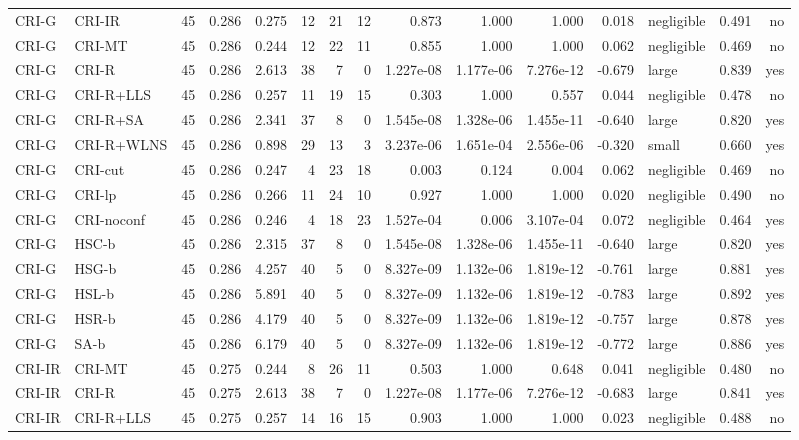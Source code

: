 \begin{table}[htbp]
\begin{tabular}{llrrrrrrrrrrlrr}
CRI-G & CRI-IR & 45 & 0.286 & 0.275 & 12 & 21 & 12 & 0.873 & 1.000 & 1.000 & 0.018 & negligible & 0.491 & no \\
CRI-G & CRI-MT & 45 & 0.286 & 0.244 & 12 & 22 & 11 & 0.855 & 1.000 & 1.000 & 0.062 & negligible & 0.469 & no \\
CRI-G & CRI-R & 45 & 0.286 & 2.613 & 38 & 7 & 0 & 1.227e-08 & 1.177e-06 & 7.276e-12 & -0.679 & large & 0.839 & yes \\
CRI-G & CRI-R+LLS & 45 & 0.286 & 0.257 & 11 & 19 & 15 & 0.303 & 1.000 & 0.557 & 0.044 & negligible & 0.478 & no \\
CRI-G & CRI-R+SA & 45 & 0.286 & 2.341 & 37 & 8 & 0 & 1.545e-08 & 1.328e-06 & 1.455e-11 & -0.640 & large & 0.820 & yes \\
CRI-G & CRI-R+WLNS & 45 & 0.286 & 0.898 & 29 & 13 & 3 & 3.237e-06 & 1.651e-04 & 2.556e-06 & -0.320 & small & 0.660 & yes \\
CRI-G & CRI-cut & 45 & 0.286 & 0.247 & 4 & 23 & 18 & 0.003 & 0.124 & 0.004 & 0.062 & negligible & 0.469 & no \\
CRI-G & CRI-lp & 45 & 0.286 & 0.266 & 11 & 24 & 10 & 0.927 & 1.000 & 1.000 & 0.020 & negligible & 0.490 & no \\
CRI-G & CRI-noconf & 45 & 0.286 & 0.246 & 4 & 18 & 23 & 1.527e-04 & 0.006 & 3.107e-04 & 0.072 & negligible & 0.464 & yes \\
CRI-G & HSC-b & 45 & 0.286 & 2.315 & 37 & 8 & 0 & 1.545e-08 & 1.328e-06 & 1.455e-11 & -0.640 & large & 0.820 & yes \\
CRI-G & HSG-b & 45 & 0.286 & 4.257 & 40 & 5 & 0 & 8.327e-09 & 1.132e-06 & 1.819e-12 & -0.761 & large & 0.881 & yes \\
CRI-G & HSL-b & 45 & 0.286 & 5.891 & 40 & 5 & 0 & 8.327e-09 & 1.132e-06 & 1.819e-12 & -0.783 & large & 0.892 & yes \\
CRI-G & HSR-b & 45 & 0.286 & 4.179 & 40 & 5 & 0 & 8.327e-09 & 1.132e-06 & 1.819e-12 & -0.757 & large & 0.878 & yes \\
CRI-G & SA-b & 45 & 0.286 & 6.179 & 40 & 5 & 0 & 8.327e-09 & 1.132e-06 & 1.819e-12 & -0.772 & large & 0.886 & yes \\
CRI-IR & CRI-MT & 45 & 0.275 & 0.244 & 8 & 26 & 11 & 0.503 & 1.000 & 0.648 & 0.041 & negligible & 0.480 & no \\
CRI-IR & CRI-R & 45 & 0.275 & 2.613 & 38 & 7 & 0 & 1.227e-08 & 1.177e-06 & 7.276e-12 & -0.683 & large & 0.841 & yes \\
CRI-IR & CRI-R+LLS & 45 & 0.275 & 0.257 & 14 & 16 & 15 & 0.903 & 1.000 & 1.000 & 0.023 & negligible & 0.488 & no \\

\end{tabular}
\end{table}

